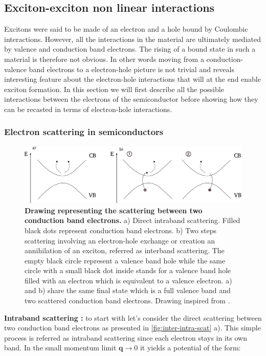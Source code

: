 \subsection{Exciton-exciton non linear interactions}

Excitons were said to be made of an electron and a hole bound by Coulombic interactions. However, all the interactions in the material are ultimately mediated by valence and conduction band electrons. The rising
of a bound state in such a material is therefore not obvious. In other words moving from a conduction-valence band electrons to a electron-hole picture is not trivial and reveals interesting
feature about the electron-hole interactions that will at the end enable exciton formation. In this section we will first describe all the possible interactions between the electrons of the semiconductor before showing how they can be recasted in terms of electron-hole interactions.

\bigskip
\subsubsection{Electron scattering in semiconductors}
\begin{figure}[h]
    \centering
    \includegraphics[width=1\linewidth]{chap1/fig/intra-inter-band-processes.pdf}
    \caption{\textbf{Drawing representing the scattering between two conduction band electrons.} a) Direct intraband scattering. Filled black dots represent conduction band electrons. b) Two steps scattering involving an electron-hole exchange or creation an annihilation of an exciton, referred as interband scattering.
    The empty black circle represent a valence band hole while the same circle with a small black dot inside stands for a valence band hole filled with an electron which is equivalent to a valence electron. a) and b) share the same
     final state which is a full valence band and two scattered conduction band electrons. Drawing inspired from \cite{Combescot_cooper_excitons_2015}.}
    \label{fig:inter-intra-scat}
\end{figure}


\textbf{Intraband scattering :}
to start with let's consider the direct scattering between two conduction band electrons as presented in \autoref{fig:inter-intra-scat} a). This simple process is referred as intraband scattering since each electron stays in its own band. In the small momentum limit $\mathrm{\textbf{q}}\to 0$ it yields a potential of the form:

